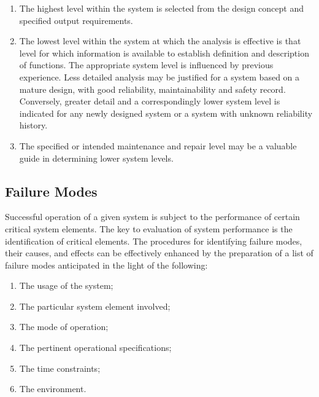 \documentclass[./dissertation.tex]{subfiles}
\begin{document}
\begin{enumerate}
\item The highest level within the system is selected from the design concept and specified output requirements.
\item The lowest level within the system at which the analysis is effective is that level for which information is available to establish definition and description of functions. The appropriate system level is influenced by previous experience. Less detailed analysis may be justified for a system based on a mature design, with good reliability, maintainability and safety record. Conversely, greater detail and a correspondingly lower system level is indicated for any newly designed system or a system with unknown reliability history.
\item The specified or intended maintenance and repair level may be a valuable guide in determining lower system levels.
\end{enumerate}






\subsection{Failure Modes}
Successful operation of a given system is subject to the performance of certain critical system elements. The key to evaluation of system performance is the identification of critical elements. The procedures for identifying failure modes, their causes, and effects can be effectively enhanced by the preparation of a list of failure modes anticipated in the light of the following:

\begin{enumerate}
\item The usage of the system;
\item The particular system element involved;
\item The mode of operation;
\item The pertinent operational specifications;
\item The time constraints;
\item The environment.
\end{enumerate}
\end{document}
